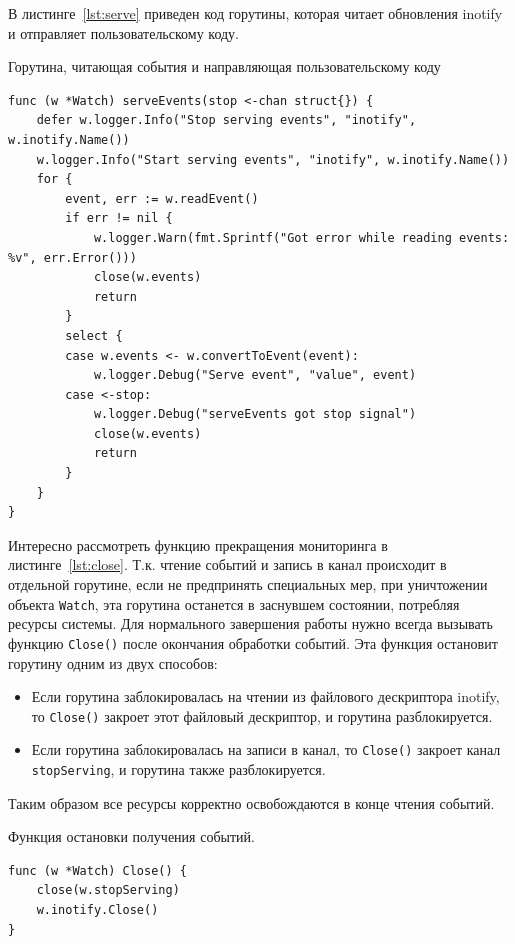 \documentclass[14pt, russian]{scrartcl}
\newcommand{\code}[1]{\texttt{#1}}
\begin{document}
В листинге~\ref{lst:serve} приведен код горутины, которая читает обновления
inotify и отправляет пользовательскому коду.

\begin{listing}[H]
\caption{Горутина, читающая события и направляющая пользовательскому коду}
\label{lst:serve}
\begin{verbatim}
func (w *Watch) serveEvents(stop <-chan struct{}) {
	defer w.logger.Info("Stop serving events", "inotify", w.inotify.Name())
	w.logger.Info("Start serving events", "inotify", w.inotify.Name())
	for {
		event, err := w.readEvent()
		if err != nil {
			w.logger.Warn(fmt.Sprintf("Got error while reading events: %v", err.Error()))
			close(w.events)
			return
		}
		select {
		case w.events <- w.convertToEvent(event):
			w.logger.Debug("Serve event", "value", event)
		case <-stop:
			w.logger.Debug("serveEvents got stop signal")
			close(w.events)
			return
		}
	}
}
\end{verbatim}
\end{listing}

Интересно рассмотреть функцию прекращения мониторинга в
листинге~\ref{lst:close}. Т.к. чтение событий и запись в канал происходит в
отдельной горутине, если не предпринять специальных мер, при уничтожении объекта
\code{Watch}, эта горутина останется в заснувшем состоянии, потребляя ресурсы
системы. Для нормального завершения работы нужно всегда вызывать функцию
\code{Close()} после окончания обработки событий. Эта функция остановит горутину одним из двух способов:

\begin{itemize}
  \item Если горутина заблокировалась на чтении из файлового дескриптора
        inotify, то \code{Close()} закроет этот файловый дескриптор, и горутина
        разблокируется.
  \item Если горутина заблокировалась на записи в канал, то \code{Close()}
        закроет канал \code{stopServing}, и горутина также разблокируется.
\end{itemize}

Таким образом все ресурсы корректно освобождаются в конце чтения событий.

\begin{listing}[H]
\caption{Функция остановки получения событий.}
\label{lst:close}
\begin{verbatim}
func (w *Watch) Close() {
	close(w.stopServing)
	w.inotify.Close()
}
\end{verbatim}
\end{listing}
\end{document}
